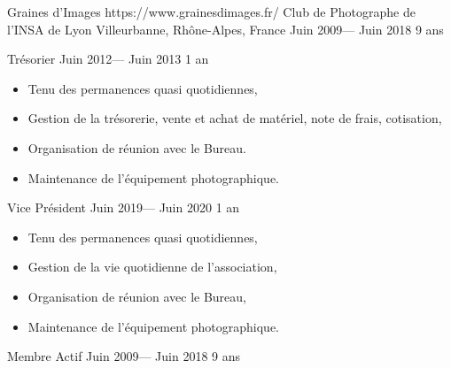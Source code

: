 \volunteerorganization%
{Graines d'Images}%
{https://www.grainesdimages.fr/}
{Club de Photographe de l'INSA de Lyon}%
{Villeurbanne, Rhône-Alpes, France}%
{Juin 2009--- Juin 2018}%
{9 ans}

\volunteerposition%
{Trésorier}%
{Juin 2012--- Juin 2013}%
{1 an}%
{
	\begin{itemize}

    \item Tenu des permanences quasi quotidiennes,
    \item Gestion de la trésorerie, vente et achat de matériel, note de frais, cotisation,
    \item Organisation de réunion avec le Bureau.
    \item Maintenance de l'équipement photographique.
	\end{itemize}
}

\volunteerposition%
{Vice Président}%
{Juin 2019--- Juin 2020}%
{1 an}%
{
	\begin{itemize}
    \item Tenu des permanences quasi quotidiennes,
    \item Gestion de la vie quotidienne de l'association,
    \item Organisation de réunion avec le Bureau,
    \item Maintenance de l'équipement photographique.
	\end{itemize}
}

\volunteerposition%
{Membre Actif}%
{Juin 2009--- Juin 2018}%
{9 ans}%
{}
